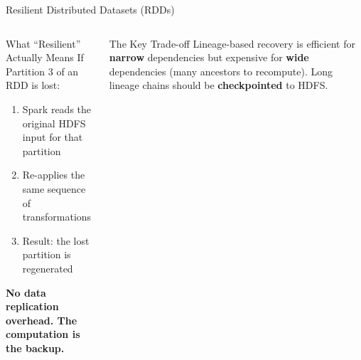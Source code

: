 \documentclass[aspectratio=169,10pt]{beamer}
\begin{document}
\begin{frame}{Resilient Distributed Datasets (RDDs)}
\begin{columns}[T]
\begin{exampleblock}{What ``Resilient'' Actually Means}
        If Partition 3 of an RDD is lost:
        \begin{enumerate}
          \item Spark reads the original HDFS input for that partition
          \item Re-applies the same sequence of transformations
          \item Result: the lost partition is regenerated
        \end{enumerate}
        \textbf{No data replication overhead.  The computation is the backup.}
      \end{exampleblock}
      \vspace{4pt}
      \begin{alertblock}{The Key Trade-off}
        \small Lineage-based recovery is efficient for \textbf{narrow} dependencies but expensive for \textbf{wide} dependencies (many ancestors to recompute).  Long lineage chains should be \textbf{checkpointed} to HDFS.
      \end{alertblock}
  \end{columns}
\end{frame}
\end{document}
